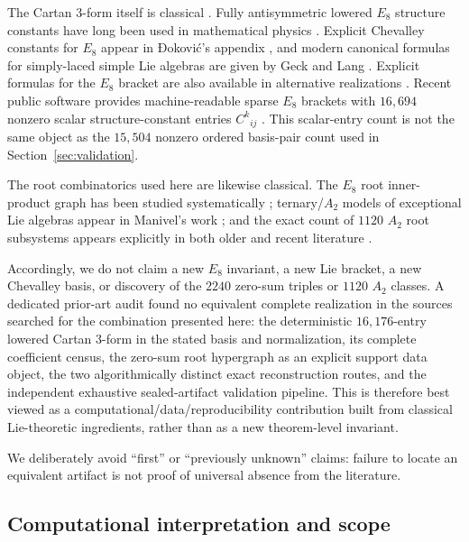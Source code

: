 \documentclass[11pt]{article}
\theoremstyle{definition}
\theoremstyle{remark}
\begin{document}
The Cartan 3-form itself is classical \cite{Le2013}.  Fully antisymmetric lowered $E_8$ structure constants have long been used in mathematical physics \cite{KoepsellNicolaiSamtleben1999}.  Explicit Chevalley constants for $E_8$ appear in Đoković's appendix \cite{Djokovic2000}, and modern canonical formulas for simply-laced simple Lie algebras are given by Geck and Lang \cite{GeckLang2025}.  Explicit formulas for the $E_8$ bracket are also available in alternative realizations \cite{Kollross2025}.  Recent public software provides machine-readable sparse $E_8$ brackets with $16{,}694$ nonzero scalar structure-constant entries $C^k{}_{ij}$ \cite{McGirl2026}.  This scalar-entry count is not the same object as the $15{,}504$ nonzero ordered basis-pair count used in Section~\ref{sec:validation}.

The root combinatorics used here are likewise classical.  The $E_8$ root inner-product graph has been studied systematically \cite{WinterVanLuijk2021}; ternary/$A_2$ models of exceptional Lie algebras appear in Manivel's work \cite{Manivel2006}; and the exact count of $1120$ $A_2$ root subsystems appears explicitly in both older and recent literature \cite{BordnerMantonSasaki2000,BohningBothmerMarquand2026}.

Accordingly, we do not claim a new $E_8$ invariant, a new Lie bracket, a new Chevalley basis, or discovery of the $2240$ zero-sum triples or $1120$ $A_2$ classes.  A dedicated prior-art audit found no equivalent complete realization in the sources searched for the combination presented here: the deterministic $16{,}176$-entry lowered Cartan 3-form in the stated basis and normalization, its complete coefficient census, the zero-sum root hypergraph as an explicit support data object, the two algorithmically distinct exact reconstruction routes, and the independent exhaustive sealed-artifact validation pipeline.  This is therefore best viewed as a computational/data/reproducibility contribution built from classical Lie-theoretic ingredients, rather than as a new theorem-level invariant.

We deliberately avoid ``first'' or ``previously unknown'' claims: failure to locate an equivalent artifact is not proof of universal absence from the literature.

\subsection{Computational interpretation and scope}\label{sec:discussion-scope}
\end{document}
